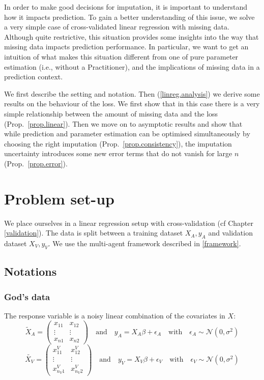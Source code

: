 In order to make good decisions for imputation, it is important to understand how it impacts prediction. To gain a better understanding of this issue, we solve a very simple case of cross-validated linear regression with missing data. Although quite restrictive, this situation provides some insights into the way that missing data impacts prediction performance. In particular, we want to get an intuition of what makes this situation different from one of pure parameter estimation (i.e., without a Practitioner), and the implications of missing data in a prediction context.

We first describe the setting and notation. Then (\ref{linreg.analysis}) we derive some results on the behaviour of the loss. We first show that in this case there is a very simple relationship between the amount of missing data and the loss (Prop.\ \ref{prop.linear}). Then we move on to asymptotic results and show that while prediction and parameter estimation can be optimised simultaneously by choosing the right imputation (Prop.\ \ref{prop.consistency}), the imputation uncertainty introduces some new error terms that do not vanish for large $n$ (Prop.\ \ref{prop.error}).

	\section{Problem set-up}
We place ourselves in a linear regression setup with cross-validation (cf Chapter \ref{validation}). The data is split between a training dataset $X_A, y_A$ and validation dataset $X_V, y_V$. We use the multi-agent framework described in \ref{framework}.
		\subsection{Notations}
			\subsubsection{God's data}
The response variable is a noisy linear combination of the covariates in $X$:
\begin{equation*}
\tilde{X}_A = 
\begin{pmatrix}
x_{11} & x_{12} \\
\vdots & \vdots \\
x_{n1} & x_{n2}
\end{pmatrix}
\quad \mathrm{and} \quad
y_A = X_A \beta + \epsilon_A
\quad \mathrm{with} \quad
\epsilon_A \sim \mathcal{N}(0, \sigma^2)
\end{equation*}
\begin{equation*}
\tilde{X_V} = 
\begin{pmatrix}
x_{11}^V & x_{12}^V \\
\vdots & \vdots \\
x_{n_V1}^V & x_{n_V2}^V
\end{pmatrix}
\quad \mathrm{and} \quad
y_V = X_V \beta + \epsilon_V
\quad \mathrm{with} \quad
\epsilon_V \sim \mathcal{N}(0, \sigma^2)
\end{equation*}

